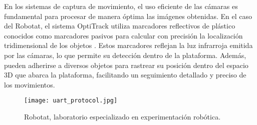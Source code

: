 En los sistemas de captura de movimiento, el uso eficiente de las cámaras es fundamental para procesar de manera óptima las imágenes obtenidas. En el caso del Robotat, el sistema OptiTrack utiliza marcadores reflectivos de plástico conocidos como marcadores pasivos para calcular con precisión la localización tridimensional de los objetos \cite{perafan_camilo_2022}. Estos marcadores reflejan la luz infrarroja emitida por las cámaras, lo que permite su detección dentro de la plataforma. Además, pueden adherirse a diversos objetos para rastrear su posición dentro del espacio 3D que abarca la plataforma, facilitando un seguimiento detallado y preciso de los movimientos.

\begin{figure}[H]
	\centering
	\texttt{[image: uart\_protocol.jpg]}
	\caption{Robotat, laboratorio especializado en experimentación robótica.}
	\label{robotat}
\end{figure}